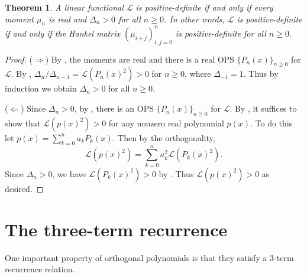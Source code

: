 \documentclass[oneside]{book}
\numberwithin{equation}{section}
\newtheorem{thm}{Theorem}[section]
\theoremstyle{definition}
\newcommand\LL{\mathcal{L}}
\begin{document}
\begin{thm}\label{thm:pos-def-equiv2}
  A linear functional \( \LL \) is positive-definite if and only if
  every moment \( \mu_n \) is real and \( \Delta_n>0 \) for all
  \( n\ge0 \). In other words, \( \LL \) is positive-definite if and
  only if the Hankel matrix \( (\mu_{i+j})_{i,j=0}^n \) is
  positive-definite for all \( n\ge0 \).
\end{thm}
\begin{proof}
  (\(\Rightarrow\)) By , the moments are real
  and there is a real OPS \( \{ P_n(x) \}_{n\ge 0} \) for \( \LL \).
  By , \( \Delta_n/\Delta_{n-1} = \LL(P_n(x)^2)>0 \)
  for \( n\ge0 \), where \( \Delta_{-1}=1 \).
  Thus by induction we obtain \( \Delta_n>0 \) for all \( n\ge0 \).

  (\(\Leftarrow\)) Since \( \Delta_n>0 \), by , there
  is an OPS \( \{ P_n(x) \}_{n\ge 0} \) for \( \LL \). By
  , it suffices to show that
  \( \LL(p(x)^2) > 0 \) for any nonzero real polynomial \( p(x) \). To
  do this let \( p(x) = \sum_{k=0}^n a_k P_k(x) \). Then by the
  orthogonality,
  \[
    \LL(p(x)^2) = \sum_{k=0}^n a_k^2 \LL(P_k(x)^2).
  \]
  Since \( \Delta_n>0 \), we have \( \LL(P_k(x)^2)>0 \) by
  . Thus \( \LL(p(x)^2)>0 \) as desired.
\end{proof}


\section{The three-term recurrence}

One important property of orthogonal polynomials is that they satisfy
a 3-term recurrence relation.
\end{document}

